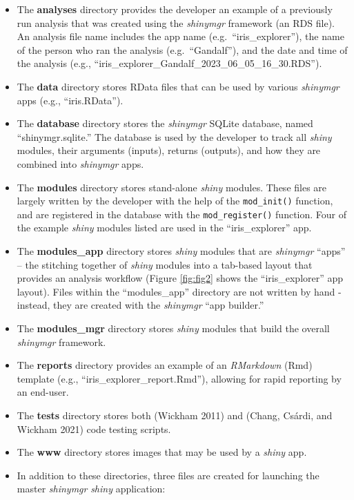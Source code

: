 \begin{itemize}
\item
  The \textbf{analyses} directory provides the developer an example of a previously run analysis that was created using the \emph{shinymgr} framework (an RDS file). An analysis file name includes the app name (e.g.~``iris\_explorer''), the name of the person who ran the analysis (e.g.~``Gandalf''), and the date and time of the analysis (e.g., ``iris\_explorer\_Gandalf\_2023\_06\_05\_16\_30.RDS'').
\item
  The \textbf{data} directory stores RData files that can be used by various \emph{shinymgr} apps (e.g., ``iris.RData'').
\item
  The \textbf{database} directory stores the \emph{shinymgr} SQLite database, named ``shinymgr.sqlite.'' The database is used by the developer to track all \emph{shiny} modules, their arguments (inputs), returns (outputs), and how they are combined into \emph{shinymgr} apps.
\item
  The \textbf{modules} directory stores stand-alone \emph{shiny} modules. These files are largely written by the developer with the help of the \texttt{mod\_init()} function, and are registered in the database with the \texttt{mod\_register()} function. Four of the example \emph{shiny} modules listed are used in the ``iris\_explorer'' app.
\item
  The \textbf{modules\_app} directory stores \emph{shiny} modules that are \emph{shinymgr} ``apps'' -- the stitching together of \emph{shiny} modules into a tab-based layout that provides an analysis workflow (Figure \ref{fig:fig2} shows the
  ``iris\_explorer'' app layout). Files within the ``modules\_app'' directory are not written by hand - instead, they are created with the \emph{shinymgr} ``app builder.''
\item
  The \textbf{modules\_mgr} directory stores \emph{shiny} modules that build the overall \emph{shinymgr} framework.
\item
  The \textbf{reports} directory provides an example of an \emph{RMarkdown} (Rmd) template (e.g., ``iris\_explorer\_report.Rmd''), allowing for rapid reporting by an end-user.
\item
  The \textbf{tests} directory stores both  (Wickham 2011) and  (Chang, Csárdi, and Wickham 2021) code testing scripts.
\item
  The \textbf{www} directory stores images that may be used by a \emph{shiny} app.
\item
  In addition to these directories, three files are created for launching the master \emph{shinymgr} \emph{shiny} application:


\end{itemize}
